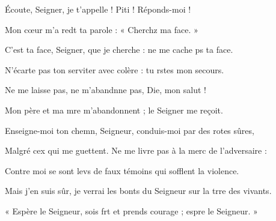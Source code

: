\item Écoute, Seigner, je t’appelle !\psstar{} Piti ! Réponds-moi !
\item Mon cœur m’a redt ta parole :\psstar{} « Cherchz ma face. »
\item C’est ta face, Seigner, que je cherche :\psstar{} ne me cache ps ta face.
\item N’écarte pas ton serviter avec colère :\psstar{} tu rstes mon secours.
\item Ne me laisse pas, ne m’abandnne pas,\psstar{} Die, mon salut !
\item Mon père et ma mre m’abandonnent ;\psstar{} le Seigner me reçoit.
\item Enseigne-moi ton chemn, Seigneur,\psstar{} conduis-moi par des rotes sûres,
\item Malgré cex qui me guettent.\psstar{} Ne me livre pas à la merc de l’adversaire :
\item Contre moi se sont levs de faux témoins\psstar{} qui sofflent la violence.
\item Mais j’en suis sûr, je verrai les bonts du Seigneur\psstar{} sur la trre des vivants.
\item « Espère le Seigneur, sois frt et prends courage ;\psstar{} espre le Seigneur. »
